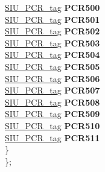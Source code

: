 \begin{DoxyCompactItemize}
\begin{tabbing}
\>\>\mbox{\hyperlink{unionSIU__tag_1_1SIU__PCR__tag}{SIU\_PCR\_tag}} {\bfseries PCR500}\\
\>\>\mbox{\hyperlink{unionSIU__tag_1_1SIU__PCR__tag}{SIU\_PCR\_tag}} {\bfseries PCR501}\\
\>\>\mbox{\hyperlink{unionSIU__tag_1_1SIU__PCR__tag}{SIU\_PCR\_tag}} {\bfseries PCR502}\\
\>\>\mbox{\hyperlink{unionSIU__tag_1_1SIU__PCR__tag}{SIU\_PCR\_tag}} {\bfseries PCR503}\\
\>\>\mbox{\hyperlink{unionSIU__tag_1_1SIU__PCR__tag}{SIU\_PCR\_tag}} {\bfseries PCR504}\\
\>\>\mbox{\hyperlink{unionSIU__tag_1_1SIU__PCR__tag}{SIU\_PCR\_tag}} {\bfseries PCR505}\\
\>\>\mbox{\hyperlink{unionSIU__tag_1_1SIU__PCR__tag}{SIU\_PCR\_tag}} {\bfseries PCR506}\\
\>\>\mbox{\hyperlink{unionSIU__tag_1_1SIU__PCR__tag}{SIU\_PCR\_tag}} {\bfseries PCR507}\\
\>\>\mbox{\hyperlink{unionSIU__tag_1_1SIU__PCR__tag}{SIU\_PCR\_tag}} {\bfseries PCR508}\\
\>\>\mbox{\hyperlink{unionSIU__tag_1_1SIU__PCR__tag}{SIU\_PCR\_tag}} {\bfseries PCR509}\\
\>\>\mbox{\hyperlink{unionSIU__tag_1_1SIU__PCR__tag}{SIU\_PCR\_tag}} {\bfseries PCR510}\\
\>\>\mbox{\hyperlink{unionSIU__tag_1_1SIU__PCR__tag}{SIU\_PCR\_tag}} {\bfseries PCR511}\\
\>\} \\
\}; \\


\end{tabbing}
\end{DoxyCompactItemize}
